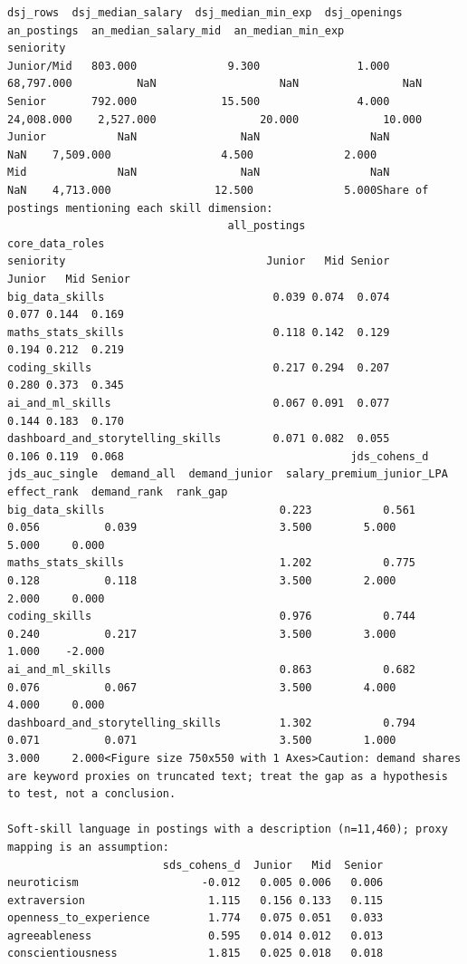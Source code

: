 \documentclass[conference]{IEEEtran}
\begin{document}
\begin{lstlisting}[style=outputstyle,caption={Execution Output G.9: Market Premiums and Strategic Alignment.},label={out:market_bridge}]
dsj_rows  dsj_median_salary  dsj_median_min_exp  dsj_openings  an_postings  an_median_salary_mid  an_median_min_exp
seniority                                                                                                                      
Junior/Mid   803.000              9.300               1.000    68,797.000          NaN                   NaN                NaN
Senior       792.000             15.500               4.000    24,008.000    2,527.000                20.000             10.000
Junior           NaN                NaN                 NaN           NaN    7,509.000                 4.500              2.000
Mid              NaN                NaN                 NaN           NaN    4,713.000                12.500              5.000Share of postings mentioning each skill dimension:
                                  all_postings              core_data_roles             
seniority                               Junior   Mid Senior          Junior   Mid Senior
big_data_skills                          0.039 0.074  0.074           0.077 0.144  0.169
maths_stats_skills                       0.118 0.142  0.129           0.194 0.212  0.219
coding_skills                            0.217 0.294  0.207           0.280 0.373  0.345
ai_and_ml_skills                         0.067 0.091  0.077           0.144 0.183  0.170
dashboard_and_storytelling_skills        0.071 0.082  0.055           0.106 0.119  0.068                                   jds_cohens_d  jds_auc_single  demand_all  demand_junior  salary_premium_junior_LPA  effect_rank  demand_rank  rank_gap
big_data_skills                           0.223           0.561       0.056          0.039                      3.500        5.000        5.000     0.000
maths_stats_skills                        1.202           0.775       0.128          0.118                      3.500        2.000        2.000     0.000
coding_skills                             0.976           0.744       0.240          0.217                      3.500        3.000        1.000    -2.000
ai_and_ml_skills                          0.863           0.682       0.076          0.067                      3.500        4.000        4.000     0.000
dashboard_and_storytelling_skills         1.302           0.794       0.071          0.071                      3.500        1.000        3.000     2.000<Figure size 750x550 with 1 Axes>Caution: demand shares are keyword proxies on truncated text; treat the gap as a hypothesis to test, not a conclusion.

Soft-skill language in postings with a description (n=11,460); proxy mapping is an assumption:
                        sds_cohens_d  Junior   Mid  Senior
neuroticism                   -0.012   0.005 0.006   0.006
extraversion                   1.115   0.156 0.133   0.115
openness_to_experience         1.774   0.075 0.051   0.033
agreeableness                  0.595   0.014 0.012   0.013
conscientiousness              1.815   0.025 0.018   0.018
\end{lstlisting}
\end{document}
